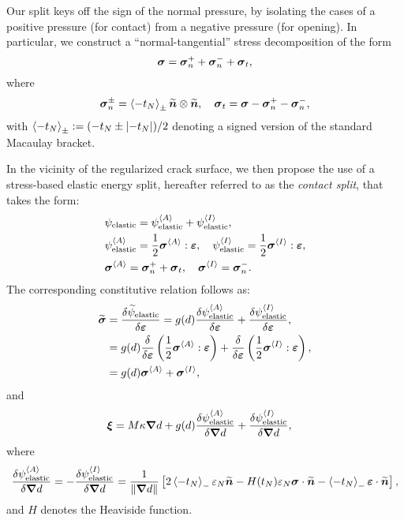 Our split keys off the sign of the normal pressure, by isolating the cases of a positive pressure (for contact) from a negative pressure (for opening).  In particular, we construct a ``normal-tangential'' stress decomposition of the form
\begin{equation}
  \boldsymbol{\sigma}  = \boldsymbol{\sigma}_n^{+} + \boldsymbol{\sigma}_n^{-}  + \boldsymbol{\sigma}_t ,
\end{equation}
where
\begin{equation}
  \boldsymbol{\sigma}_n^\pm = \left<-t_N\right>_\pm\widetilde{\boldsymbol{n}}\otimes\widetilde{\boldsymbol{n}}, \quad  \boldsymbol{\sigma}_t = \boldsymbol{\sigma} - \boldsymbol{\sigma}_n^+ - \boldsymbol{\sigma}_n^-,
\end{equation}
with $\left<-t_N\right>_\pm := (-t_N \pm \left\vert{-t_N}\right\vert)/2$ denoting a signed version of the standard Macaulay bracket.

In the vicinity of the regularized crack surface, we then propose the use of a stress-based elastic energy split, hereafter referred to as the \textit{contact split},
that takes the form:
\begin{subequations}
  \begin{align}
     & \psi_{\text{elastic}} = \psi_{\text{elastic}}^{\left< A \right>} + \psi_{\text{elastic}}^{\left< I \right>} , \label{eq: odd begin}                                                          \\
     & \psi_{\text{elastic}}^{\left< A \right>} = \dfrac{1}{2}\boldsymbol{\sigma}^{\left< A \right>}:\boldsymbol{\varepsilon}, \quad \psi_{\text{elastic}}^{\left< I \right>} = \dfrac{1}{2}\boldsymbol{\sigma}^{\left< I \right>}:\boldsymbol{\varepsilon} , \\
     & \boldsymbol{\sigma}^{\left< A \right>} = \boldsymbol{\sigma}_n^+ + \boldsymbol{\sigma}_t, \quad \boldsymbol{\sigma}^{\left< I \right>} = \boldsymbol{\sigma}_n^-.
  \end{align}
\end{subequations}
The corresponding constitutive relation follows as:
\begin{subequations}
  \begin{align}
    \widetilde{\boldsymbol{\sigma}} & = \dfrac{\delta\widetilde{\psi}_{\text{elastic}}}{\delta\boldsymbol{\varepsilon}} = g(d)\dfrac{\delta\psi_{\text{elastic}}^{\left< A \right>}}{\delta\boldsymbol{\varepsilon}} + \dfrac{\delta\psi_{\text{elastic}}^{\left< I \right>}}{\delta\boldsymbol{\varepsilon}} ,  \\
                        & = g(d)\dfrac{\delta}{\delta\boldsymbol{\varepsilon}}\left( \dfrac{1}{2}\boldsymbol{\sigma}^{\left< A \right>}:\boldsymbol{\varepsilon} \right) + \dfrac{\delta}{\delta\boldsymbol{\varepsilon}}\left( \dfrac{1}{2}\boldsymbol{\sigma}^{\left< I \right>}:\boldsymbol{\varepsilon} \right) , \\
                        & = g(d)\boldsymbol{\sigma}^{\left< A \right>} + \boldsymbol{\sigma}^{\left< I \right>} , \label{eq: odd end}
  \end{align}
\end{subequations}
and
\begin{align}
  \boldsymbol{\xi} & = M \kappa \boldsymbol{\nabla} d + g(d) \dfrac{\delta \psi_{\text{elastic}}^{\left< A \right>}}{\delta \boldsymbol{\nabla} d} + \dfrac{\delta \psi_{\text{elastic}}^{\left< I \right>}}{\delta \boldsymbol{\nabla} d} ,
\end{align}
where
\begin{align}
  \dfrac{\delta \psi_{\text{elastic}}^{\left< A \right>}}{\delta \boldsymbol{\nabla} d} = -\dfrac{\delta \psi_{\text{elastic}}^{\left< I \right>}}{\delta \boldsymbol{\nabla} d} = \dfrac{1}{\left\lVert\boldsymbol{\nabla} d\right\rVert} \left[ 2 \left<-t_N\right>_- \varepsilon_N \widetilde{\boldsymbol{n}} - H(t_N) \varepsilon_N \boldsymbol{\sigma} \cdot \widetilde{\boldsymbol{n}} - \left<-t_N\right>_- \boldsymbol{\varepsilon} \cdot \widetilde{\boldsymbol{n}} \right],
\end{align}
and $H$ denotes the Heaviside function.

